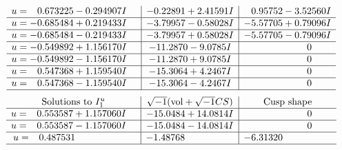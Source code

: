\documentclass[1p]{elsarticle_modified}
\theoremstyle{definition}
\newcommand{\I}{\sqrt{-1}}
\begin{document}
$$\begin{array}{c|c|c}
\begin{aligned}
u &= \phantom{-}0.673225 - 0.294907 I\end{aligned}
 & -0.22891 + 2.41591 I & \phantom{-}0.95752 - 3.52560 I \\ \hline\begin{aligned}
u &= -0.685484 + 0.219433 I\end{aligned}
 & -3.79957 - 0.58028 I & -5.57705 + 0.79096 I \\ \hline\begin{aligned}
u &= -0.685484 - 0.219433 I\end{aligned}
 & -3.79957 + 0.58028 I & -5.57705 - 0.79096 I \\ \hline\begin{aligned}
u &= -0.549892 + 1.156170 I\end{aligned}
 & -11.2870 - 9.0785 I & \phantom{-0.000000 } 0 \\ \hline\begin{aligned}
u &= -0.549892 - 1.156170 I\end{aligned}
 & -11.2870 + 9.0785 I & \phantom{-0.000000 } 0 \\ \hline\begin{aligned}
u &= \phantom{-}0.547368 + 1.159540 I\end{aligned}
 & -15.3064 + 4.2467 I & \phantom{-0.000000 } 0 \\ \hline\begin{aligned}
u &= \phantom{-}0.547368 - 1.159540 I\end{aligned}
 & -15.3064 - 4.2467 I & \phantom{-0.000000 } 0\\
 \hline 
 \end{array}$$\newpage$$\begin{array}{c|c|c}  
\text{Solutions to }I^u_{1}& \I (\text{vol} + \sqrt{-1}CS) & \text{Cusp shape}\\
 \hline 
\begin{aligned}
u &= \phantom{-}0.553587 + 1.157060 I\end{aligned}
 & -15.0484 + 14.0814 I & \phantom{-0.000000 } 0 \\ \hline\begin{aligned}
u &= \phantom{-}0.553587 - 1.157060 I\end{aligned}
 & -15.0484 - 14.0814 I & \phantom{-0.000000 } 0 \\ \hline\begin{aligned}
u &= \phantom{-}0.487531\phantom{ +0.000000I}\end{aligned}
 & -1.48768\phantom{ +0.000000I} & -6.31320\phantom{ +0.000000I}\\
 \hline 
 \end{array}$$\newpage
\end{document}
